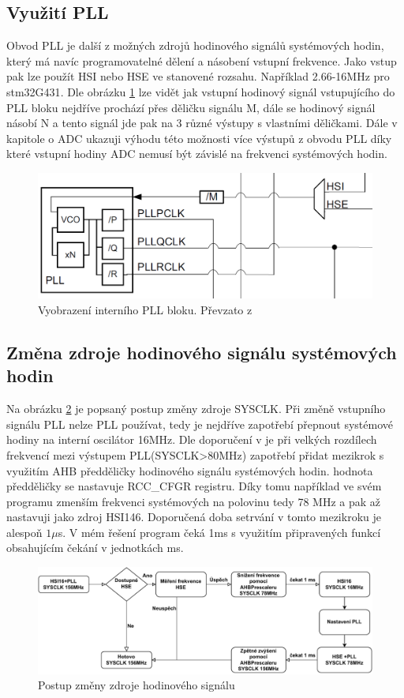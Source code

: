 \subsection{Využití PLL}
Obvod PLL je další z možných zdrojů hodinového signálů systémových hodin, který má navíc programovatelné dělení a násobení vstupní frekvence. Jako vstup pak lze použít HSI nebo HSE ve stanovené rozsahu. Například 2.66-16MHz  pro stm32G431\cite{dataG431}. Dle obrázku \ref{fig:plldiagram} lze vidět jak vstupní hodinový signál vstupujícího do PLL bloku  nejdříve prochází přes děličku signálu M, dále se hodinový signál násobí N a tento signál jde pak na 3 různé výstupy s vlastními děličkami. Dále v kapitole o ADC ukazuji výhodu této možnosti více výstupů z obvodu PLL díky které vstupní hodiny ADC nemusí být závislé na frekvenci systémových hodin. 

\begin{figure}[H]
	\centering
	\includegraphics[width=0.6\linewidth]{Figs/Documentation/PLL_Diagram}
	\caption{Vyobrazení interního PLL bloku. Převzato z}
	\label{fig:plldiagram}
\end{figure}    

\subsection{Změna zdroje hodinového signálu systémových hodin}
Na obrázku \ref{fig:hsekonfigurace} je popsaný postup změny zdroje SYSCLK. Při změně vstupního signálu PLL nelze PLL používat, tedy je nejdříve zapotřebí přepnout systémové hodiny na interní oscilátor 16MHz. Dle doporučení v \cite{refG4} je při velkých rozdílech frekvencí mezi výstupem PLL(SYSCLK>80MHz) zapotřebí přidat mezikrok s využitím AHB předděličky hodinového signálu systémových hodin. hodnota předděličky se nastavuje RCC\_CFGR registru. Díky tomu například ve svém programu zmenším frekvenci systémových na polovinu tedy 78 MHz a pak až nastavuji jako zdroj HSI146. Doporučená doba setrvání v tomto mezikroku je alespoň $1\mu$s. V mém řešení program čeká 1ms s využitím připravených funkcí obsahujícím čekání v jednotkách ms.


\begin{figure}[H]
	\centering
	\includegraphics[width=1\linewidth]{Figs/Documentation/HSE_Konfigurace}
	\caption{Postup změny zdroje hodinového signálu}
	\label{fig:hsekonfigurace}
\end{figure}
